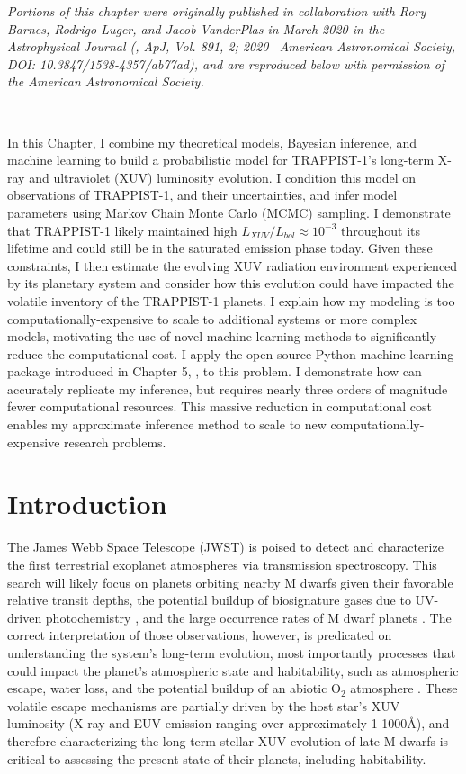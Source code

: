 \textit{Portions of this chapter were originally published in collaboration with Rory Barnes, Rodrigo Luger, and Jacob VanderPlas in March 2020 in the Astrophysical Journal (\citet{Fleming2020}, ApJ, Vol. 891, 2; 2020 \textcopyright \ American Astronomical Society, DOI: 10.3847/1538-4357/ab77ad), and are reproduced below with permission of the American Astronomical Society.}

\

In this Chapter, I combine my theoretical models, Bayesian inference, and machine learning to build a probabilistic model for TRAPPIST-1's long-term X-ray and ultraviolet (XUV) luminosity evolution. I condition this model on observations of TRAPPIST-1, and their uncertainties, and infer model parameters using Markov Chain Monte Carlo (MCMC) sampling. I demonstrate that TRAPPIST-1 likely maintained high $L_{XUV}/L_{bol} \approx 10^{-3}$ throughout its lifetime and could still be in the saturated emission phase today. Given these constraints, I then estimate the evolving XUV radiation environment experienced by its planetary system and consider how this evolution could have impacted the volatile inventory of the TRAPPIST-1 planets. I explain how my modeling is too computationally-expensive to scale to additional systems or more complex models, motivating the use of novel machine learning methods to significantly reduce the computational cost. I apply the open-source Python machine learning package introduced in Chapter 5, \approxposterior, to this problem. I demonstrate how \approxposterior can accurately replicate my inference, but requires nearly three orders of magnitude fewer computational resources. This massive reduction in computational cost enables my approximate inference method to scale to new computationally-expensive research problems. 


\section{Introduction} \label{trap:sec:intro}

The James Webb Space Telescope (JWST) is poised to detect and characterize the first terrestrial exoplanet atmospheres via transmission spectroscopy. This search will likely focus on planets orbiting nearby M dwarfs given their favorable relative transit depths, the potential buildup of biosignature gases due to UV-driven photochemistry \citep{Segura2005}, and the large occurrence rates of M dwarf planets \citep{Dressing2015}. The correct interpretation of those observations, however, is predicated on understanding the system's long-term evolution, most importantly processes that could impact the planet's atmospheric state and habitability, such as atmospheric escape, water loss, and the potential buildup of an abiotic O$_2$ atmosphere \citep{Watson1981,Lammer2003,MurrayClay2009,Luger2015}. These volatile escape mechanisms are partially driven by the host star's XUV luminosity (X-ray and EUV emission ranging over approximately 1-1000\AA), and therefore characterizing the long-term stellar XUV evolution of late M-dwarfs is critical to assessing the present state of their planets, including habitability.

